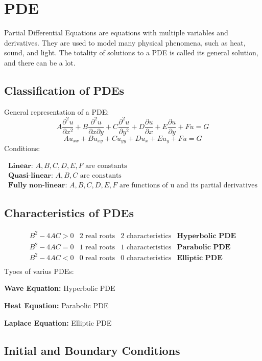 \section{PDE}
Partial Differential Equations are equations with multiple variables and derivatives.
They are used to model many physical phenomena, such as heat, sound, and light.
The totality of solutions to a PDE is called its general solution, and there can be a lot.

\subsection{Classification of PDEs}
General representation of a PDE:
\[
  A\frac{\partial^2u}{\partial x^2}+B\frac{\partial^2u}{\partial x\partial y}+C\frac{\partial^2u}{\partial y^2}+D\frac{\partial u}{\partial x}+E\frac{\partial u}{\partial y}+Fu=G
\]
\[
  Au_{xx}+Bu_{xy}+Cu_{yy}+Du_x+Eu_y+Fu=G
\]
Conditions:

$$\begin{array}{l}
\textbf{Linear: }A,B,C,D,E,F \text{ are constants}\\
\textbf{Quasi-linear: }A,B,C \text{ are constants}\\
\textbf{Fully non-linear: }A,B,C,D,E,F \text{ are functions of u and its partial derivatives}
\end{array}$$

\subsection{Characteristics of PDEs}
$$\begin{array}{llll}
  B^2-4AC>0&2\text{ real roots}&2\text{ characteristics}&\textbf{Hyperbolic PDE}\\
  B^2-4AC=0&1\text{ real roots}&1\text{ characteristics}&\textbf{Parabolic PDE}\\
  B^2-4AC<0&0\text{ real roots}&0\text{ characteristics}&\textbf{Elliptic PDE}\\
\end{array}$$
Tyoes of varius PDEs:

\textbf{Wave Equation:} Hyperbolic PDE

\textbf{Heat Equation:} Parabolic PDE

\textbf{Laplace Equation:} Elliptic PDE

\subsection{Initial and Boundary Conditions}

